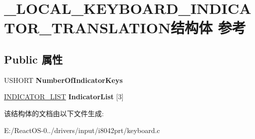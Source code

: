 \hypertarget{struct___l_o_c_a_l___k_e_y_b_o_a_r_d___i_n_d_i_c_a_t_o_r___t_r_a_n_s_l_a_t_i_o_n}{}\section{\+\_\+\+L\+O\+C\+A\+L\+\_\+\+K\+E\+Y\+B\+O\+A\+R\+D\+\_\+\+I\+N\+D\+I\+C\+A\+T\+O\+R\+\_\+\+T\+R\+A\+N\+S\+L\+A\+T\+I\+O\+N结构体 参考}
\label{struct___l_o_c_a_l___k_e_y_b_o_a_r_d___i_n_d_i_c_a_t_o_r___t_r_a_n_s_l_a_t_i_o_n}
\subsection*{Public 属性}
\begin{DoxyCompactItemize}
\item 
\mbox{\label{struct___l_o_c_a_l___k_e_y_b_o_a_r_d___i_n_d_i_c_a_t_o_r___t_r_a_n_s_l_a_t_i_o_n_ad479f936f23a5505999d8b9c4970bacc}} 
U\+S\+H\+O\+RT {\bfseries Number\+Of\+Indicator\+Keys}
\item 
\mbox{\label{struct___l_o_c_a_l___k_e_y_b_o_a_r_d___i_n_d_i_c_a_t_o_r___t_r_a_n_s_l_a_t_i_o_n_ae6dab089a265f0f81792e56b5bfaf833}} 
\hyperlink{struct___i_n_d_i_c_a_t_o_r___l_i_s_t}{I\+N\+D\+I\+C\+A\+T\+O\+R\+\_\+\+L\+I\+ST} {\bfseries Indicator\+List} \mbox{[}3\mbox{]}
\end{DoxyCompactItemize}


该结构体的文档由以下文件生成\+:\begin{DoxyCompactItemize}
\item 
E\+:/\+React\+O\+S-\/0../drivers/input/i8042prt/keyboard.\+c\end{DoxyCompactItemize}
